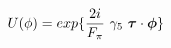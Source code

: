 \begin{equation}
U(\phi)= exp\{\frac{2i}{F_\pi}~\gamma_5~\mbox{\boldmath$\tau$} \cdot \mbox{\boldmath$\phi$} \}
\end{equation}

